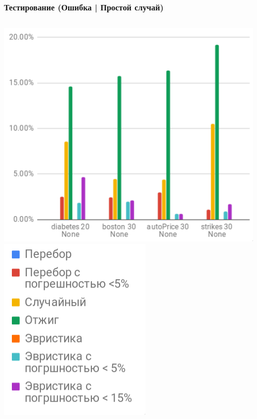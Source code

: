 \documentclass{beamer}
\begin{document}
\begin{frame} \frametitle{Тестирование (Ошибка | Простой случай)}
    \vfill
    \begin{columns}
        \includegraphics[width=\textwidth]{error_easy.png}
        \includegraphics[width=\textwidth]{time_legend.png}
    \end{columns}
\end{frame}
\end{document}

